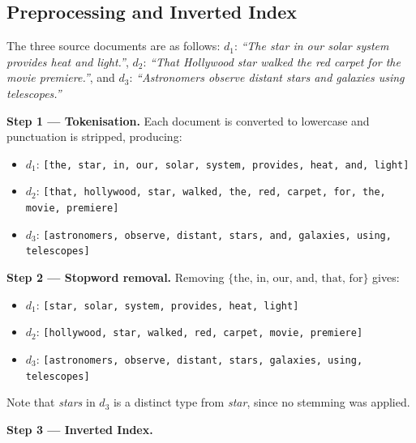 \documentclass{svproc}
\begin{document}
    \subsection{Preprocessing and Inverted Index}

    The three source documents are as follows: $d_1$: \textit{``The star in our solar system provides heat and light.''}, $d_2$: \textit{``That Hollywood star walked the red carpet for the movie premiere.''}, and $d_3$: \textit{``Astronomers observe distant stars and galaxies using telescopes.''}

    \textbf{Step 1 — Tokenisation.} Each document is converted to lowercase and punctuation is stripped, producing:
    \begin{itemize}[noitemsep]
        \item $d_1$: \texttt{[the, star, in, our, solar, system, provides, heat, and, light]}
        \item $d_2$: \texttt{[that, hollywood, star, walked, the, red, carpet, for, the, movie, premiere]}
        \item $d_3$: \texttt{[astronomers, observe, distant, stars, and, galaxies, using, telescopes]}
    \end{itemize}

    \textbf{Step 2 — Stopword removal.} Removing $\{\text{the, in, our, and, that, for}\}$ gives:
    \begin{itemize}[noitemsep]
        \item $d_1$: \texttt{[star, solar, system, provides, heat, light]}
        \item $d_2$: \texttt{[hollywood, star, walked, red, carpet, movie, premiere]}
        \item $d_3$: \texttt{[astronomers, observe, distant, stars, galaxies, using, telescopes]}
    \end{itemize}
    Note that \textit{stars} in $d_3$ is a distinct type from \textit{star}, since no stemming was applied.

    \textbf{Step 3 — Inverted Index.}
\end{document}
